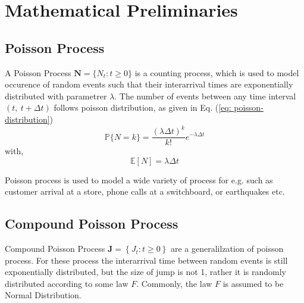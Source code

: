 \documentclass[paper.tex]{subfiles}
\begin{document}
    \section{Mathematical Preliminaries}
        \subsection{Poisson Process}
        A Poisson Process $ \boldsymbol{N} = \{N_{t}: t \geqslant 0 \} $ is a counting process, which is used to model occurence of random events such that their interarrival times are exponentially distributed with parametrer $ \lambda $.
        The number of events between any time interval $ (t, ~ t + \Delta t) $ follows poisson distribution, as given in Eq. (\ref{eq: poisson-distribution})
        \begin{equation}
            \mathbb{P}\{N=k\}= \dfrac{(\lambda \Delta t)^{k}}{k!} e^{-\lambda \Delta t}
            \label{eq: poisson-distribution}
        \end{equation}
        with,
        \begin{equation}
            \mathbb{E}\left[ N \right] = \lambda \Delta t
            \label{eq: poisson-mean}
        \end{equation}
          
        Poisson process is used to model a wide variety of process for e.g. such as customer arrival at a store, phone calls at a switchboard, or earthquakes etc.
        
        \subsection{Compound Poisson Process}
        Compound Poisson Process $\boldsymbol{J}=\left\{J_{t}: t \geqslant 0 \right\}$  are a generalilzation of poisson process.
        For these process the interarrival time between random events is still exponentially distributed, but the size of jump is not 1, rather it is randomly distributed according to some law $ F $.
        Commonly, the law $ F $ is assumed to be Normal Distribution.
\end{document}
